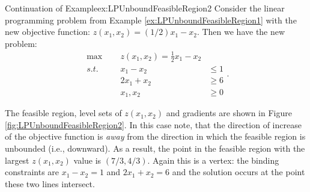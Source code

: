 \begin{example}{Continuation of Example}{ex:LPUnboundFeasibleRegion2}
Consider the linear programming problem from Example \ref{ex:LPUnboundFeasibleRegion1} with the new objective function: $z(x_1,x_2) = (1/2)x_1 - x_2$. Then we have the new problem:
\begin{equation}
\begin{aligned}
\max\;\;&& z(x_1,x_2) =\frac{1}{2}x_1 - x_2\\
s.t.\;\;&& x_1 - x_2 &\leq 1\\
&& 2x_1 + x_2 &\geq 6\\
&&x_1,x_2 &\geq 0
\end{aligned}.
\label{eqn:LPUnboundFeasibleRegion2}
\end{equation}
\end{example}
\begin{solution}
The feasible region, level sets of $z(x_1,x_2)$ and gradients are shown in Figure \ref{fig:LPUnboundFeasibleRegion2}. In this case note, that the direction of increase of the objective function is \textit{away} from the direction in which the feasible region is unbounded (i.e., downward). As a result, the point in the feasible region with the largest $z(x_1,x_2)$ value is $(7/3,4/3)$. Again this is a vertex: the binding constraints are $x_1 - x_2 = 1$ and $2x_1 + x_2 = 6$ and the solution occurs at the point these two lines intersect.
\begin{figure}[H]%
\begin{center}
\end{center}
\end{figure}
\end{solution}
